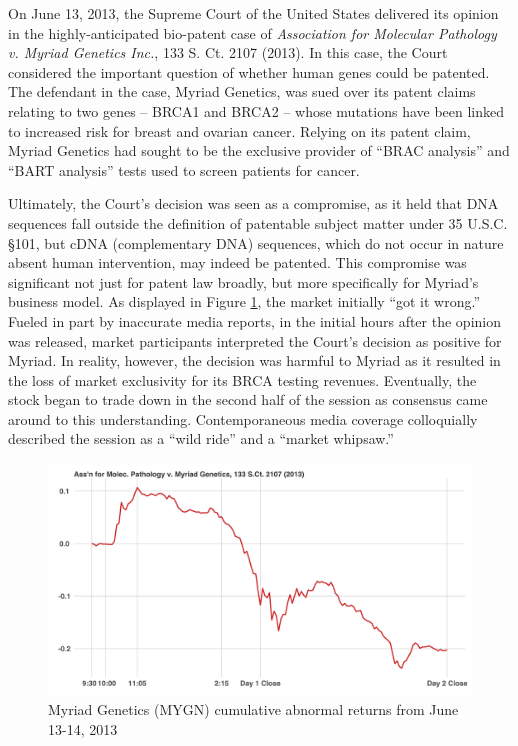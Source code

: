 \documentclass[preprint,12pt]{elsarticle}
\begin{document}
On June 13, 2013, the Supreme Court of the United States delivered its opinion in the highly-anticipated bio-patent case of \textit{Association for Molecular Pathology v. Myriad Genetics Inc.}, 133 S. Ct. 2107  (2013).  In this case, the Court considered the important question of whether human genes could be patented.  The defendant in the case, Myriad Genetics, was sued over its patent claims relating to two genes -- BRCA1 and BRCA2 -- whose mutations have been linked to increased risk for breast and ovarian cancer.  Relying on its patent claim, Myriad Genetics had sought to be the exclusive provider of ``BRAC analysis'' and ``BART analysis'' tests used to screen patients for cancer.

Ultimately, the Court's decision was seen as a compromise, as it held that DNA sequences fall outside the definition of patentable subject matter under 35 U.S.C. \S 101, but cDNA (complementary DNA) sequences, which do not occur in nature absent human intervention, may indeed be patented.  This compromise was significant not just for patent law broadly, but more specifically for Myriad's business model.  As displayed in Figure \ref{myriad_return}, the market initially ``got it wrong.''  Fueled in part by inaccurate media reports, in the initial hours after the opinion was released, market participants interpreted the Court's decision as positive for Myriad.  In reality, however, the decision was harmful to Myriad as it resulted in the loss of market exclusivity for its BRCA testing revenues.  Eventually, the stock began to trade down in the second half of the session as consensus came around to this understanding.  Contemporaneous media coverage colloquially described the session as a ``wild ride'' and a ``market whipsaw.'' 

\begin{figure}[h]
\centering\includegraphics[width=0.9\linewidth]{figure1_myriad_return}
\caption{Myriad Genetics (MYGN) cumulative abnormal returns from June 13-14, 2013}
\label{myriad_return}
\end{figure}
\end{document}
